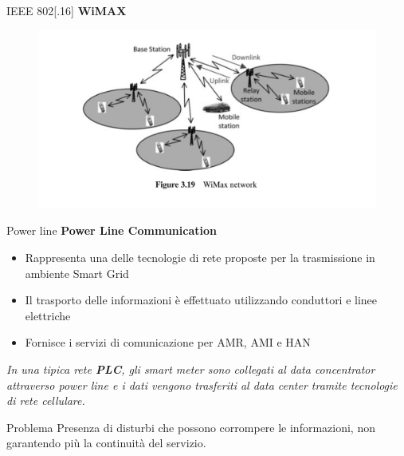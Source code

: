 \begin{frame}{IEEE 802[.16]}
	\textbf{WiMAX}
	\begin{figure}[h]
		\includegraphics[scale=0.3,cfbox=blue_slides 1pt 0pt]{imgs/wim.png}
	\end{figure}
\end{frame}

\begin{frame}{Power line}
	\textbf{Power Line Communication}
	\begin{itemize}[<+- | alert@+>]
		\item Rappresenta una delle tecnologie di rete proposte per la trasmissione in ambiente Smart Grid
		\item Il trasporto delle informazioni è effettuato utilizzando conduttori e linee elettriche %
		\item Fornisce i servizi di comunicazione per AMR, AMI e HAN
	\end{itemize}
	\pause
	\begin{block}{}
		\textit{In una tipica rete \textbf{\color{blue_slides}PLC}, gli smart meter sono collegati al data concentrator attraverso power line e i dati vengono trasferiti al data center tramite tecnologie di rete cellulare.}
	\end{block}
	\pause
	\begin{block}{Problema}
		Presenza di disturbi che possono corrompere le informazioni, non garantendo più la continuità del servizio.
	\end{block}
\end{frame}


